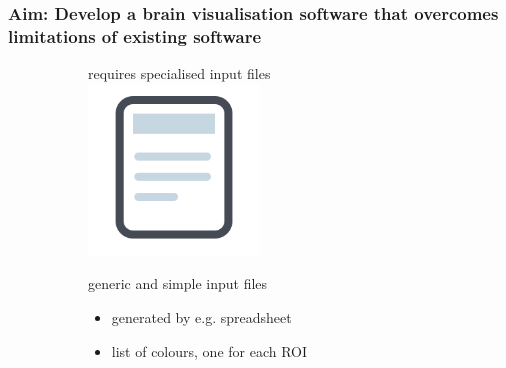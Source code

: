 \documentclass[10pt,xcolor=table,aspectratio=169]{beamer}
\newcommand{\xmark}{\ding{55}}%
\begin{document}
\begin{frame}
 \frametitle{Aim: Develop a brain visualisation software that overcomes limitations of existing software}


 
\newcommand{\myyes}{\textcolor{green1}{\Large{\textbf{\checkmark}}}}
\newcommand{\myno}{\textcolor{red1}{\Large{\xmark}}}

 \vspace{-0.5cm}
\begin{figure}
\centering
\begin{subfigure}[t]{0.3\textwidth}
\centering
 \begin{minipage}[t][3.5cm][t]{\textwidth}
 \centering
\myno requires specialised input files\\
\includegraphics[width=0.5\textwidth]{images/inputFile} 
 \end{minipage}


\myyes generic and simple input files

\begin{itemize}
 \item generated by e.g. spreadsheet
 \item list of colours, one for each ROI
\end{itemize}




\end{subfigure}
\end{figure}
\end{frame}
\end{document}
